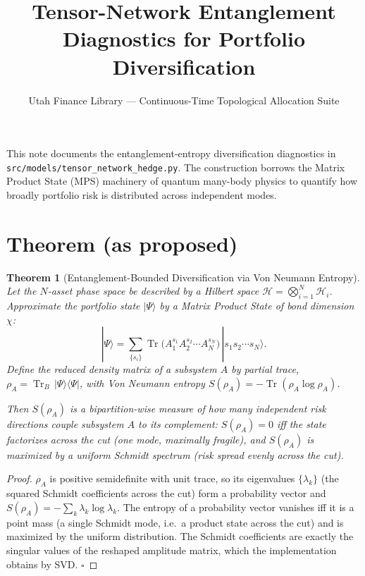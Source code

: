 \documentclass[11pt]{article}
\title{Tensor-Network Entanglement Diagnostics for Portfolio Diversification}
\author{Utah Finance Library --- Continuous-Time Topological Allocation Suite}
\date{}
\newtheorem{theorem}{Theorem}
\begin{document}
\maketitle

\noindent
This note documents the entanglement-entropy diversification diagnostics in
\texttt{src/models/tensor\_network\_hedge.py}. The construction borrows the
Matrix Product State (MPS) machinery of quantum many-body physics to quantify how
broadly portfolio risk is distributed across independent modes.

\section*{Theorem (as proposed)}

\begin{theorem}[Entanglement-Bounded Diversification via Von Neumann Entropy]
Let the $N$-asset phase space be described by a Hilbert space
$\mathcal{H} = \bigotimes_{i=1}^N \mathcal{H}_i$. Approximate the portfolio state
$|\Psi\rangle$ by a Matrix Product State of bond dimension $\chi$:
\begin{equation}
|\Psi\rangle = \sum_{\{s_i\}} \operatorname{Tr}\!\big(A^{s_1}_1 A^{s_2}_2 \cdots A^{s_N}_N\big)\,
|s_1 s_2 \cdots s_N\rangle .
\end{equation}
Define the reduced density matrix of a subsystem $A$ by partial trace,
$\rho_A = \operatorname{Tr}_{B}\,|\Psi\rangle\langle\Psi|$, with Von Neumann
entropy $S(\rho_A) = -\operatorname{Tr}(\rho_A \log \rho_A)$.

Then $S(\rho_A)$ is a bipartition-wise measure of how many independent risk
directions couple subsystem $A$ to its complement: $S(\rho_A)=0$ iff the state
factorizes across the cut (one mode, maximally fragile), and $S(\rho_A)$ is
maximized by a uniform Schmidt spectrum (risk spread evenly across the cut).
\end{theorem}

\begin{proof}
$\rho_A$ is positive semidefinite with unit trace, so its eigenvalues
$\{\lambda_k\}$ (the squared Schmidt coefficients across the cut) form a
probability vector and $S(\rho_A) = -\sum_k \lambda_k \log \lambda_k$. The
entropy of a probability vector vanishes iff it is a point mass (a single Schmidt
mode, i.e.\ a product state across the cut) and is maximized by the uniform
distribution. The Schmidt coefficients are exactly the singular values of the
reshaped amplitude matrix, which the implementation obtains by SVD. $\square$
\end{proof}
\end{document}
